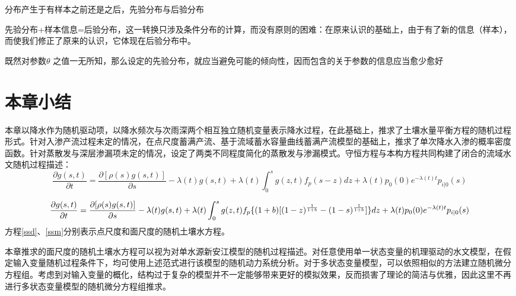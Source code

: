 分布产生于有样本之前还是之后，先验分布与后验分布

先验分布+样本信息=后验分布，这一转换只涉及条件分布的计算，而没有原则的困难：在原来认识的基础上，由于有了新的信息（样本），而使我们修正了原来的认识，它体现在后验分布中。

既然对参数$\theta$ 之值一无所知，那么设定的先验分布，就应当避免可能的倾向性，因而包含的关于参数的信息应当愈少愈好
\fi



\section{本章小结}
本章以降水作为随机驱动项，以降水频次与次雨深两个相互独立随机变量表示降水过程，在此基础上，推求了土壤水量平衡方程的随机过程形式。针对入渗产流过程未定的情况，在点尺度蓄满产流、基于流域蓄水容量曲线蓄满产流模型的基础上，推求了单次降水入渗的概率密度函数。针对蒸散发与深层渗漏项未定的情况，设定了两类不同程度简化的蒸散发与渗漏模式。守恒方程与本构方程共同构建了闭合的流域水文随机过程描述：
\begin{equation}
\label{ssd}
\frac{\partial{g(s,t)}}{\partial t}=\frac{\partial{[\rho(s)g(s,t)]}}{\partial s}-\lambda(t)g(s,t)+\lambda(t)\int_{0}^{s} g(z,t)f_{p}(s-z)dz+\lambda(t)p_0(0)e^{-\lambda(t) t}p_{i|0}(s)
\end{equation}

\begin{equation}\small
\label{ssm}
\frac{\partial{g(s,t)}}{\partial t}=\frac{\partial{[\rho(s)g(s,t)]}}{\partial s}-\lambda(t)g(s,t)+\lambda(t)\int_{0}^{s} g(z,t)f_{p}\{(1+b) [(1-z)^{\frac{1}{1+b}}-(1-s)^{\frac{1}{1+b}} ] \}dz+\lambda(t)p_0(0)e^{-\lambda(t) t}p_{i|0}(s)
\end{equation}
方程\ref{ssd}、\ref{ssm}分别表示点尺度和面尺度的随机土壤水方程。

本章推求的面尺度的随机土壤水方程可以视为对单水源新安江模型的随机过程描述。对任意使用单一状态变量的机理驱动的水文模型，在假定输入变量随机过程条件下，均可使用上述范式进行该模型的随机动力系统分析。对于多状态变量模型，可以依照相似的方法建立随机微分方程组。考虑到对输入变量的概化，结构过于复杂的模型并不一定能够带来更好的模拟效果，反而损害了理论的简洁与优雅，因此这里不再进行多状态变量模型的随机微分方程组推求。


